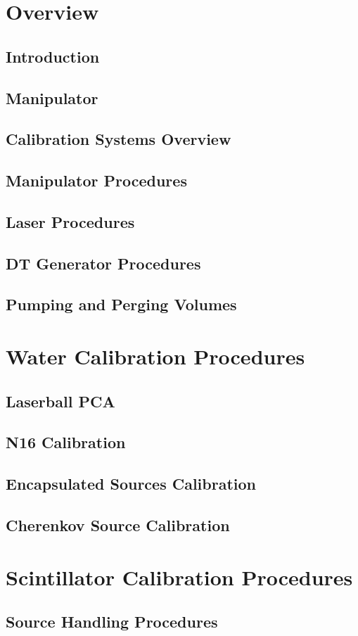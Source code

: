 \documentclass[10pt]{report}
\begin{document}
\part{Overview}
\chapter{Introduction}

\chapter{Manipulator}

\chapter{Calibration Systems Overview}




\chapter{Manipulator Procedures}

\chapter{Laser Procedures}

\chapter{DT Generator Procedures}


\chapter{Pumping and Perging Volumes}
\part{Water Calibration Procedures}
\chapter{Laserball PCA}

\chapter{N16 Calibration}

\chapter{Encapsulated Sources Calibration}

\chapter{Cherenkov Source Calibration}


\part{Scintillator Calibration Procedures}
\chapter{Source Handling Procedures}

\end{document}
